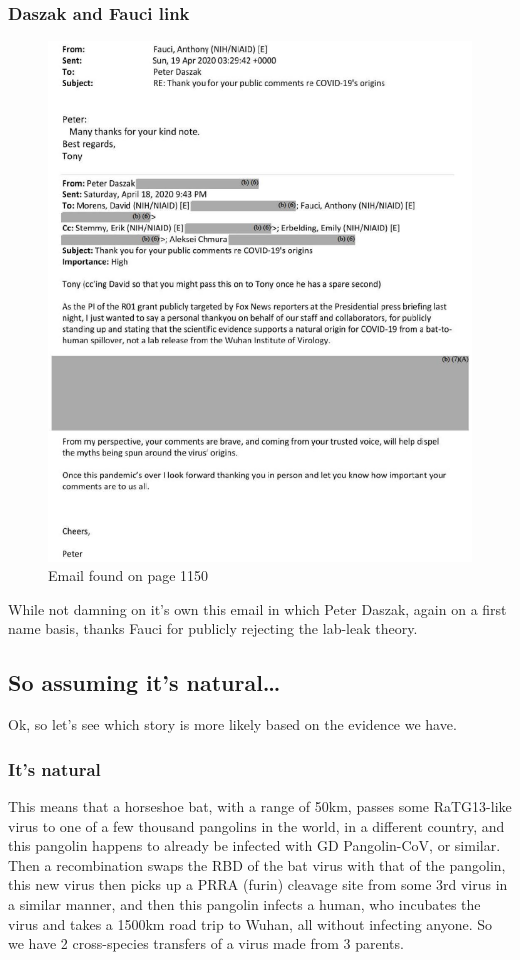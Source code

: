 \documentclass[11pt]{article}
\begin{document}
\subsubsection{Daszak and Fauci link}
\label{sec:org2591547}
\begin{figure}[htbp]
\centering
\includegraphics[width=.9\linewidth]{./images/email-daszak-thank-you.png}
\caption{Email found on page 1150}
\end{figure}
While not damning on it's own this email in which Peter Daszak, again on a first name basis, thanks Fauci for publicly rejecting the lab-leak theory.

\subsection{So assuming it's natural\ldots{}}
\label{sec:org8740467}
Ok, so let's see which story is more likely based on the evidence we have.
\subsubsection{It's natural}
\label{sec:orgfda1405}
This means that a horseshoe bat, with a range of 50km, passes some RaTG13-like virus to one of a few thousand pangolins in the world, in a different country, and this pangolin happens to already be infected with GD Pangolin-CoV, or similar. Then a recombination swaps the RBD of the bat virus with that of the pangolin, this new virus then picks up a PRRA (furin) cleavage site from some 3rd virus in a similar manner, and then this pangolin infects a human, who incubates the virus and takes a 1500km road trip to Wuhan, all without infecting anyone. So we have 2 cross-species transfers of a virus made from 3 parents.
\end{document}
